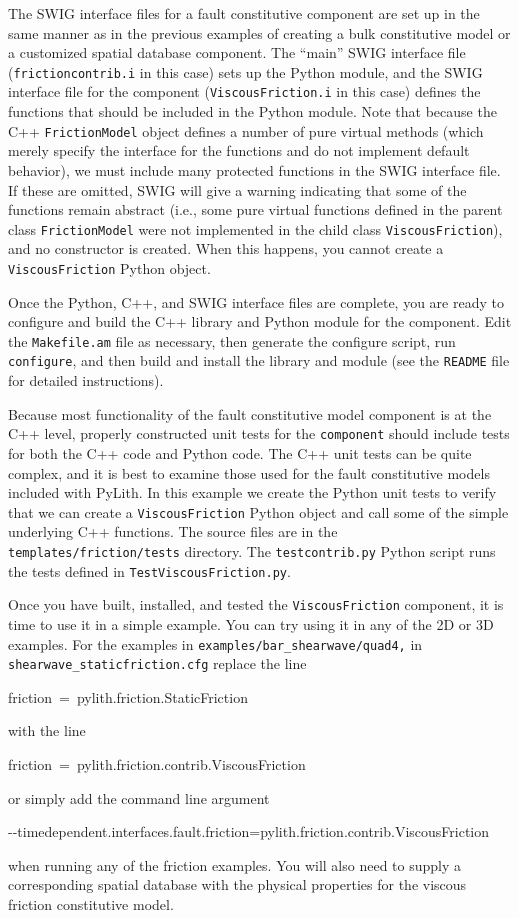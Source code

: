 The SWIG interface files for a fault constitutive component are set
up in the same manner as in the previous examples of creating a bulk
constitutive model or a customized spatial database component. The
``main'' SWIG interface file (\texttt{frictioncontrib.i} in this case)
sets up the Python module, and the SWIG interface file for the component
(\texttt{ViscousFriction.i} in this case) defines the functions that
should be included in the Python module. Note that because the C++
\texttt{FrictionModel} object defines a number of pure virtual methods
(which merely specify the interface for the functions and do not implement
default behavior), we must include many protected functions in the
SWIG interface file. If these are omitted, SWIG will give a warning
indicating that some of the functions remain abstract (i.e., some
pure virtual functions defined in the parent class \texttt{FrictionModel}
were not implemented in the child class \texttt{ViscousFriction}),
and no constructor is created. When this happens, you cannot create
a \texttt{ViscousFriction} Python object.

Once the Python, C++, and SWIG interface files are complete, you are
ready to configure and build the C++ library and Python module for
the component. Edit the \texttt{Makefile.am} file as necessary, then
generate the configure script, run \texttt{configure}, and then build
and install the library and module (see the \texttt{README} file for
detailed instructions).

Because most functionality of the fault constitutive model component
is at the C++ level, properly constructed unit tests for the \texttt{component}
should include tests for both the C++ code and Python code. The C++
unit tests can be quite complex, and it is best to examine those used
for the fault constitutive models included with PyLith. In this example
we create the Python unit tests to verify that we can create a \texttt{ViscousFriction}
Python object and call some of the simple underlying C++ functions.
The source files are in the \texttt{templates/friction/tests} directory.
The \texttt{testcontrib.py} Python script runs the tests defined in
\texttt{TestViscousFriction.py}.

Once you have built, installed, and tested the \texttt{ViscousFriction}
component, it is time to use it in a simple example. You can try using
it in any of the 2D or 3D examples. For the examples in \texttt{examples/bar\_shearwave/quad4,}
in \texttt{shearwave\_staticfriction.cfg} replace the line
\begin{lyxcode}
friction~=~pylith.friction.StaticFriction
\end{lyxcode}
with the line
\begin{lyxcode}
friction~=~pylith.friction.contrib.ViscousFriction
\end{lyxcode}
or simply add the command line argument
\begin{lyxcode}
-{}-timedependent.interfaces.fault.friction=pylith.friction.contrib.ViscousFriction
\end{lyxcode}
when running any of the friction examples. You will also need to supply
a corresponding spatial database with the physical properties for
the viscous friction constitutive model.
